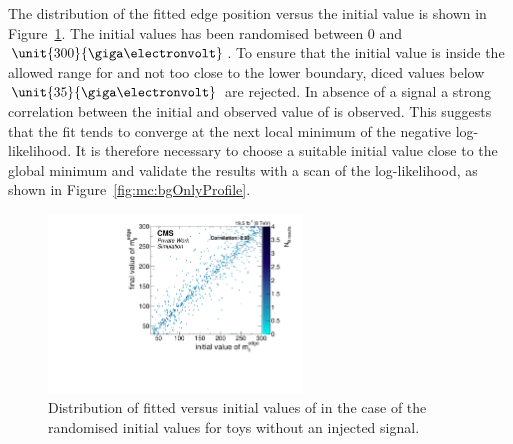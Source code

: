 The distribution of the fitted edge position versus the initial value is shown in Figure~\ref{fig:toys:backgroundOnlyFloatEdge}. The initial values has been randomised between 0 and $\unit{300}{\giga\electronvolt}$. To ensure that the initial value is inside the allowed range for \mlledge and not too close to the lower boundary, diced values below $\unit{35}{\giga\electronvolt}$ are rejected. In absence of a signal a strong correlation between the initial and observed value of \mlledge is observed. This suggests that the fit tends to converge at the next local minimum of the negative log-likelihood. It is therefore necessary to choose a suitable initial value close to the global minimum and validate the results with a scan of the log-likelihood, as shown in Figure~\ref{fig:mc:bgOnlyProfile}. 

\begin{figure}[htbp]
  \centering

    \includegraphics[width=0.6\textwidth]{plots/results/fit/toyResults/fittedM0vsinitialM0_backgroundOnly_randM0_NegSig.pdf}
  \caption{Distribution of fitted versus initial values of \mlledge in the case of the randomised initial values for toys without an injected signal.}
  \label{fig:toys:backgroundOnlyFloatEdge}
\end{figure}

